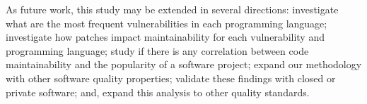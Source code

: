 \documentclass[10pt,conference]{IEEEtran}
\begin{document}
As future work, this study may be extended in several directions: 
investigate what are the most frequent vulnerabilities in each programming
language; investigate how patches impact maintainability for each
vulnerability and programming language;
study if there is any correlation between code maintainability and
the popularity of a software project; expand our methodology with other
software quality properties; validate these findings with closed or private
software; and, expand this analysis to other quality standards.


%
%
\balance

{
  
  
}
\end{document}
